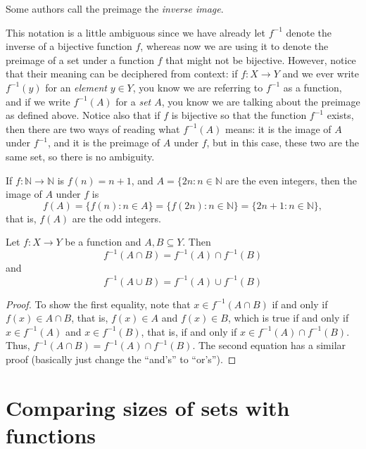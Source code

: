 \documentclass[11pt,dvipsnames]{book}
\numberwithin{figure}{section} %
\numberwithin{table}{section} %
\begin{document}
Some authors call the preimage the \emph{inverse image}.

This notation is a little ambiguous since we have already let $f^{-1}$ denote the inverse of a bijective function $f$, whereas now we are using it to denote the preimage of a set under a function $f$ that might not be bijective. However, notice that their meaning can be deciphered from context: if $f\colon X\rightarrow Y$ and we ever write $f^{-1}(y)$ for an {\it element} $y\in Y$, you know we are referring to $f^{-1}$ as a function, and if we write $f^{-1}(A)$ for a {\it set $A$}, you know we are talking about the preimage as defined above. Notice also that if $f$ is bijective so that the function $f^{-1}$ exists, then there are two ways of reading what $f^{-1}(A)$ means: it is the image of $A$ under $f^{-1}$, and it is the preimage of $A$ under $f$, but in this case, these two are the same set, so there is no ambiguity.

\begin{example}
If  $f\colon\mathbb{N}\rightarrow \mathbb{N}$ is $f(n)=n+1$, and $A=\{2n:n\in\mathbb{N}$ are the even integers, then the image of $A$ under $f$ is
\[
f(A)=\{f(n):n\in A\} = \{f(2n): n\in\mathbb{N}\} = \{2n+1:n\in\mathbb{N}\},\]
that is, $f(A)$ are the odd integers.
\end{example}

\begin{theorem}
Let $f:X\rightarrow Y$ be a function and $A,B\subseteq Y$. Then
\[
f^{-1}(A\cap B)=f^{-1}(A)\cap f^{-1}(B)
\]
and
\[
f^{-1}(A\cup B)=f^{-1}(A)\cup f^{-1}(B)
\]
\end{theorem}

\begin{proof}
To show the first equality, note that $x\in f^{-1}(A\cap B)$ if and only if $f(x)\in A\cap B$, that is, $f(x)\in A$ and $f(x)\in B$, which is true if and only if $x\in f^{-1}(A)$ and $x\in f^{-1}(B)$, that is, if and only if $x\in f^{-1}(A)\cap f^{-1}(B)$. Thus, $f^{-1}(A\cap B)=f^{-1}(A)\cap f^{-1}(B)$. The second equation has a similar proof (basically just change the ``and's'' to ``or's'').
\end{proof}

\section{Comparing sizes of sets with functions}%
\label{sizesofsets}

\end{document}
